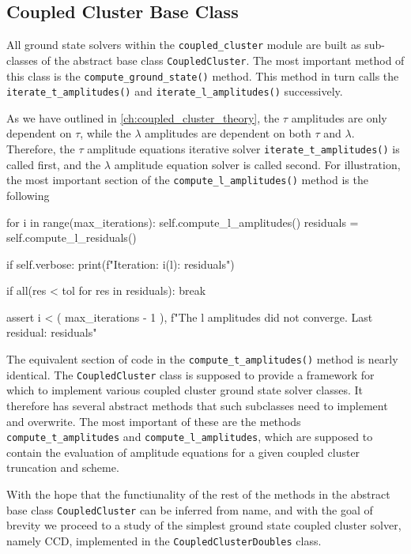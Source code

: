     \subsection{Coupled Cluster Base Class}

    All ground state solvers within the \lstinline{coupled_cluster} module are built 
    as sub-classes of the abstract base class \lstinline{CoupledCluster}. The most
    important method of this class is the \lstinline{compute_ground_state()} method.
    This method in turn calls the \lstinline{iterate_t_amplitudes()} and 
    \lstinline{iterate_l_amplitudes()} successively. 

    As we have outlined in 
    \autoref{ch:coupled_cluster_theory}, the $\tau$ amplitudes are only dependent on 
    $\tau$, while the $\lambda$ amplitudes are dependent on both $\tau$ and $\lambda$.
    Therefore, the $\tau$ amplitude equations iterative solver
    \lstinline{iterate_t_amplitudes()} is called first, and the $\lambda$ amplitude
    equation solver is called second.
    For illustration, the most important section of the \lstinline{compute_l_amplitudes()} method 
    is the following
    \begin{python}
    for i in range(max_iterations):
    self.compute_l_amplitudes()
    residuals = self.compute_l_residuals()

    if self.verbose:
        print(f"Iteration: {i}\tResiduals (l): {residuals}")

    if all(res < tol for res in residuals):
        break

    assert i < (
        max_iterations - 1
    ), f"The l amplitudes did not converge. Last residual: {residuals}" 
    \end{python}
    The equivalent section of code in the \lstinline{compute_t_amplitudes()} method is 
    nearly identical.
    The \lstinline{CoupledCluster} class is supposed to provide a framework for which 
    to implement various coupled cluster ground state solver classes. It therefore
    has several abstract methods that such subclasses need to implement and overwrite.
    The most important of these are the methods \lstinline{compute_t_amplitudes} 
    and \lstinline{compute_l_amplitudes}, which are supposed to contain the evaluation 
    of amplitude equations for a given coupled cluster truncation and scheme. 

    With the hope that the functiunality of the rest of the methods 
    in the abstract base class \lstinline{CoupledCluster} can be inferred from 
    name, and with the goal of brevity we proceed to a study of the simplest 
    ground state coupled cluster solver, namely CCD, implemented in the 
    \lstinline{CoupledClusterDoubles} class. 

